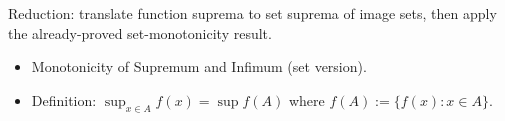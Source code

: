 \begin{remark*}
Reduction: translate function suprema to set suprema of image sets, then
apply the already-proved set-monotonicity result.
\end{remark*}

\begin{remark*}[Dependencies]
\begin{itemize}
  \item Monotonicity of Supremum and Infimum (set version).
  \item Definition: $\sup_{x \in A} f(x) = \sup f(A)$ where
        $f(A) := \{f(x) : x \in A\}$.
\end{itemize}
\end{remark*}
